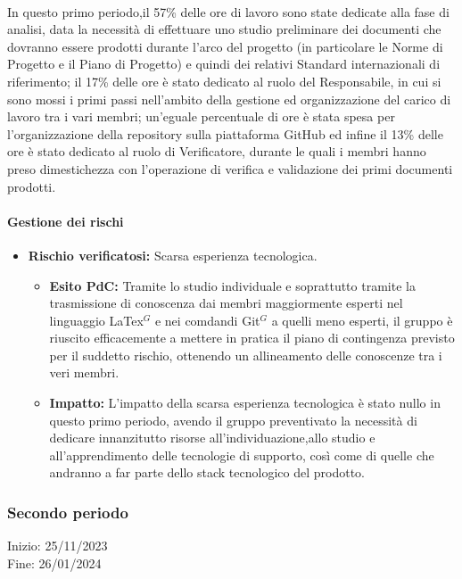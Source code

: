 \paragraph{}
In questo primo periodo,il 57\% delle ore di lavoro sono state dedicate alla fase di analisi,
data la necessità di effettuare uno studio preliminare dei documenti che dovranno essere prodotti durante
l'arco del progetto (in particolare le Norme di Progetto e il Piano di Progetto) e quindi dei relativi Standard
internazionali di riferimento; il 17\% delle ore è stato dedicato al ruolo del Responsabile, in cui si sono mossi i primi 
passi nell'ambito della gestione ed organizzazione del carico di lavoro tra i vari membri; un'eguale percentuale di ore 
è stata spesa per l'organizzazione della repository sulla piattaforma GitHub ed infine il 13\% delle ore è stato dedicato al ruolo di Verificatore,
durante le quali i membri hanno preso dimestichezza con l'operazione di verifica e validazione dei primi documenti prodotti.

\paragraph{Gestione dei rischi}

\begin{itemize}
\item \textbf{Rischio verificatosi:} Scarsa esperienza tecnologica.
\begin{itemize}
\item \textbf{Esito PdC:} Tramite lo studio individuale e soprattutto tramite la trasmissione di conoscenza dai membri maggiormente esperti nel linguaggio LaTex$^{G}$ e nei comdandi Git$^{G}$
 a quelli meno esperti, il gruppo è riuscito efficacemente a mettere in pratica il piano di contingenza previsto per il suddetto
rischio, ottenendo un allineamento delle conoscenze tra i veri membri.\\
\item \textbf{Impatto:} L'impatto della scarsa esperienza tecnologica è stato nullo in questo primo periodo, 
avendo il gruppo preventivato la necessità di dedicare innanzitutto risorse all'individuazione,allo studio e all'apprendimento
delle tecnologie di supporto, così come di quelle che andranno a far parte dello stack tecnologico del prodotto.\\ 
\end{itemize}
\end{itemize}

\subsubsection{Secondo periodo} 
Inizio: 25/11/2023 \\
Fine: 26/01/2024 \\

